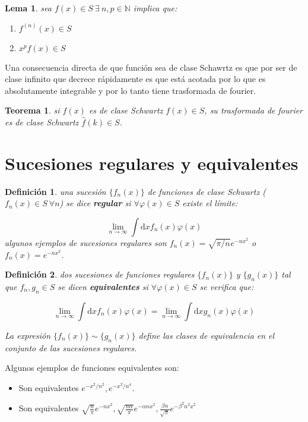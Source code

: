 \documentclass[12pt]{book}
\newcommand{\D}{\mathrm{d}}
\newcommand{\hatf}{\widehat{f}}
\newtheorem{theorem}{Teorema}[section]
\newtheorem{lemma}{Lema}[section]
\newtheorem{definicion}{Definición}[section]
\begin{document}
\begin{lemma}
sea $f(x) \in S \ \exists \ n,p \in  \mathbb{N}$ implica que:
\begin{enumerate}
\item $f^{(n)} (x) \in S$
\item $x^p f(x) \in S$
\end{enumerate} 
\end{lemma}

Una consecuencia directa de que función sea de clase Schawrtz es que por ser de clase infinito que decrece rápidamente es que está acotada por lo que es absolutamente integrable y por lo tanto tiene trasformada de fourier. 

\begin{theorem}
si $f(x)$ es de clase Schwartz $f(x) \in S$, su trasformada de fourier es de clase Schwartz $\hatf (k) \in S$. 
\end{theorem}

\section{Sucesiones regulares y equivalentes}


\begin{definicion}
una sucesión $\{ f_n (x) \}$ de funciones de clase Schwartz ($f_n (x) \in S \ \forall n$) se dice \textbf{regular} si $\forall \varphi (x) \in S$ existe el límite:

$$ \lim_{n \rightarrow \infty} \int \D x f_n (x) \varphi (x)  $$
algunos ejemplos de sucesiones regulares son $f_n (x) = \sqrt{\pi/n} e^{-nx^2}$ o $f_n (x) = e^{-nx^2}$.
\end{definicion}

\begin{definicion}
dos sucesiones de funciones regulares $\{ f_n (x) \}  $ y $ \{ g_n(x) \}$ tal que $f_n, g_n \in S$ se dicen \textbf{equivalentes} si $\forall \varphi (x) \in S$ se verifica que:

$$ \lim_{n \rightarrow \infty} \int \D x f_n (x) \varphi (x) =  \lim_{n \rightarrow \infty} \int \D x g_n (x) \varphi (x)  $$

La expresión  $\{ f_n (x) \}  \sim \{ g_n(x) \}$ define las clases de equivalencia en el conjunto de las sucesiones regulares.
\end{definicion}
Algunos ejemplos de funciones equivalentes son:

\begin{itemize}
\item Son equivalentes $e^{-x^2/n^2}, e^{-x^2/n^4}$.

\item Son equivalentes $\sqrt{\frac{n}{\pi}} e^{-nx^2}, \sqrt{\frac{n \alpha}{\pi}} e^{-\alpha nx^2}, \frac{\beta n}{\sqrt{\pi}} e^{-\beta^2 n^2 x^2}$
\end{itemize}
\end{document}
